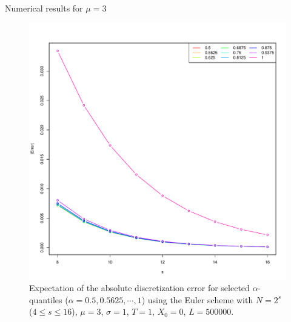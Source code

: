 \documentclass[cjk,10pt]{beamer}
\begin{document}
\begin{frame}{Numerical results for $\mu=3$}
\begin{figure}[p]
   \includegraphics[scale=0.3]{nout_4_25_3a.pdf}
   \caption{Expectation of the absolute discretization error for selected $\alpha$-quantiles ($\alpha = 0.5, 0.5625, \cdots, 1$) using the Euler scheme with $N = 2^s$ ($4\le s \le 16$), $\mu=3$, $\sigma=1$, $T=1$, $X_0=0$, $L=500000$. }
\label{f:ab3}
\end{figure}
\end{frame}
\end{document}

